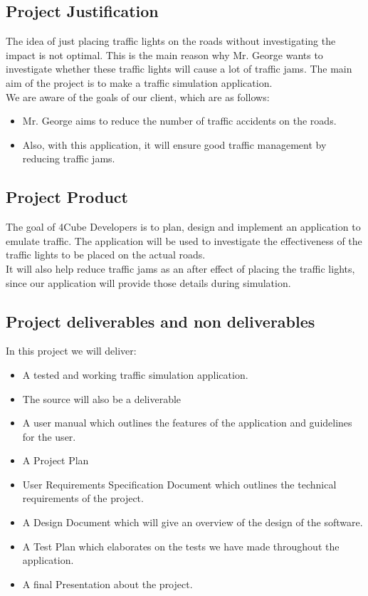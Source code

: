 \documentclass[a4paper,11pt]{article}
\begin{document}
    \subsection{Project Justification}
    The idea of just placing traffic lights on the roads without investigating the impact is not optimal. This is the main reason why Mr. George wants to investigate whether these traffic lights will cause a lot of traffic jams. The main aim of the project is to make a traffic simulation application.\\ We are aware of the goals of our client, which are as follows: 
    \begin{itemize}
    \item Mr. George aims to reduce the number of traffic accidents on the roads. 
    \item Also, with this application, it will ensure good traffic management by reducing traffic jams.
    \end{itemize}
    
    \subsection{Project Product}
    The goal of 4Cube Developers is to plan, design and implement an application to emulate traffic. The application will be used to investigate the effectiveness of the traffic lights to be placed on the actual roads. \\It will also help reduce traffic jams as an after effect of placing the traffic lights, since our application will provide those details during simulation.  
    
    \subsection{Project deliverables and non deliverables  }
    In this project we will deliver: 
    \begin{itemize}
    \item A tested and working traffic simulation application.
    \item The source will also be a deliverable
    \item A user manual which outlines the features of the application and guidelines for the user.
    \item A Project Plan
    \item User Requirements Specification Document which outlines the technical requirements of the project.
    \item A Design Document which will give an overview of the design of the software.  
    \item A Test Plan which elaborates on the tests we have made throughout the application.
    \item A final Presentation about the project.
    \end{itemize}
    
\end{document}
